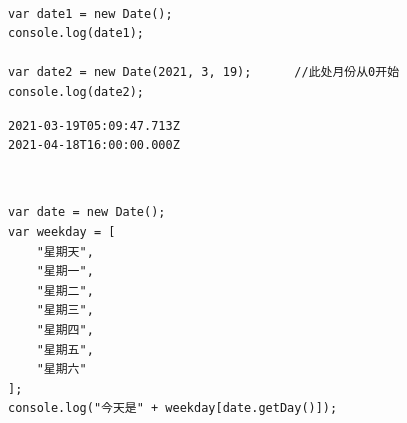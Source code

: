  \\

\begin{lstlisting}[style=htmlcssjs]
var date1 = new Date();
console.log(date1);

var date2 = new Date(2021, 3, 19);      //此处月份从0开始
console.log(date2);
\end{lstlisting}

\begin{tcolorbox}
	\begin{verbatim}
2021-03-19T05:09:47.713Z
2021-04-18T16:00:00.000Z
	\end{verbatim}
\end{tcolorbox}

\begin{table}[H]
	\centering
	\caption{Date方法}
\end{table}

 \\

\begin{lstlisting}[style=htmlcssjs]
var date = new Date();
var weekday = [
    "星期天",
    "星期一",
    "星期二",
    "星期三",
    "星期四",
    "星期五",
    "星期六"
];
console.log("今天是" + weekday[date.getDay()]);
\end{lstlisting}


